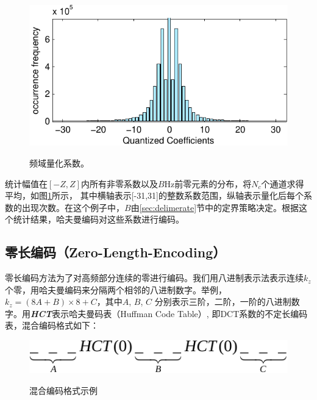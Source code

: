 \begin{figure}
  \centering
  \includegraphics{Pictures/Compression/f5-crop.pdf}\\
  \caption{频域量化系数。}\label{fig:Quantized Coefficient Distribution}
\end{figure}


统计幅值在$[-Z,Z]$内所有非零系数以及$B$Hz前零元素的分布，将$N_c$个通道求得平均，如图\ref{fig:Quantized Coefficient Distribution}所示， 其中横轴表示[-31,31]的整数系数范围，纵轴表示量化后每个系数的出现次数。在这个例子中，$B$由\ref{sec:delimerate}节中的定界策略决定。根据这个统计结果，哈夫曼编码对这些系数进行编码。



\subsection{零长编码（Zero-Length-Encoding）}
\label{Zero-Length-Encoding}

零长编码方法为了对高频部分连续的零进行编码。我们用八进制表示法表示连续$k_z$个零，用哈夫曼编码来分隔两个相邻的八进制数字。举例，$k_z=(8A+B)\times 8+C$，其中$A$, $B$, $C$ 分别表示三阶，二阶，一阶的八进制数字。用\textbf{\emph{HCT}}表示哈夫曼码表（Huffman Code Table）, 即DCT系数的不定长编码表，混合编码格式如下：

\begin{figure}[H]
  \centering
  \caption{混合编码格式示例}
  \includegraphics{Pictures/Compression/HCT-crop.pdf}\\
\end{figure}

